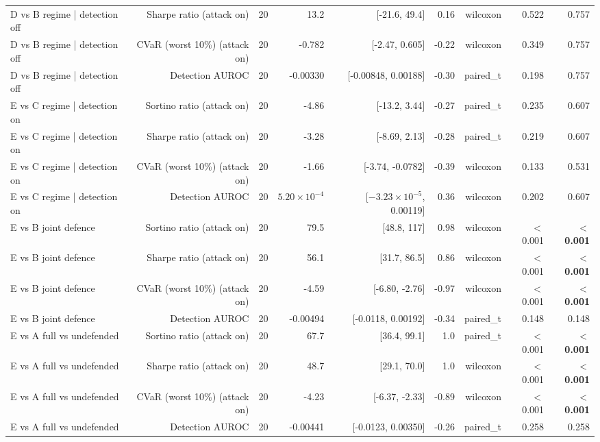 \begin{table}[htbp]
\begin{tabular}{lrrrrrrrr}
    D vs B   regime | detection off & Sharpe ratio (attack on) & 20 & 13.2 & [-21.6, 49.4] & 0.16 & wilcoxon & 0.522 & 0.757 \\
    D vs B   regime | detection off & CVaR (worst 10\%) (attack on) & 20 & -0.782 & [-2.47, 0.605] & -0.22 & wilcoxon & 0.349 & 0.757 \\
    D vs B   regime | detection off & Detection AUROC & 20 & -0.00330 & [-0.00848, 0.00188] & -0.30 & paired\_t & 0.198 & 0.757 \\
    E vs C   regime | detection on & Sortino ratio (attack on) & 20 & -4.86 & [-13.2, 3.44] & -0.27 & paired\_t & 0.235 & 0.607 \\
    E vs C   regime | detection on & Sharpe ratio (attack on) & 20 & -3.28 & [-8.69, 2.13] & -0.28 & paired\_t & 0.219 & 0.607 \\
    E vs C   regime | detection on & CVaR (worst 10\%) (attack on) & 20 & -1.66 & [-3.74, -0.0782] & -0.39 & wilcoxon & 0.133 & 0.531 \\
    E vs C   regime | detection on & Detection AUROC & 20 & $5.20\times10^{-4}$ & [$-3.23\times10^{-5}$, 0.00119] & 0.36 & wilcoxon & 0.202 & 0.607 \\
    E vs B   joint defence & Sortino ratio (attack on) & 20 & 79.5 & [48.8, 117] & 0.98 & wilcoxon & $<$0.001 & \textbf{$<$0.001} \\
    E vs B   joint defence & Sharpe ratio (attack on) & 20 & 56.1 & [31.7, 86.5] & 0.86 & wilcoxon & $<$0.001 & \textbf{$<$0.001} \\
    E vs B   joint defence & CVaR (worst 10\%) (attack on) & 20 & -4.59 & [-6.80, -2.76] & -0.97 & wilcoxon & $<$0.001 & \textbf{$<$0.001} \\
    E vs B   joint defence & Detection AUROC & 20 & -0.00494 & [-0.0118, 0.00192] & -0.34 & paired\_t & 0.148 & 0.148 \\
    E vs A   full vs undefended & Sortino ratio (attack on) & 20 & 67.7 & [36.4, 99.1] & 1.0 & paired\_t & $<$0.001 & \textbf{$<$0.001} \\
    E vs A   full vs undefended & Sharpe ratio (attack on) & 20 & 48.7 & [29.1, 70.0] & 1.0 & wilcoxon & $<$0.001 & \textbf{$<$0.001} \\
    E vs A   full vs undefended & CVaR (worst 10\%) (attack on) & 20 & -4.23 & [-6.37, -2.33] & -0.89 & wilcoxon & $<$0.001 & \textbf{$<$0.001} \\
    E vs A   full vs undefended & Detection AUROC & 20 & -0.00441 & [-0.0123, 0.00350] & -0.26 & paired\_t & 0.258 & 0.258 \\

\end{tabular}
\end{table}
